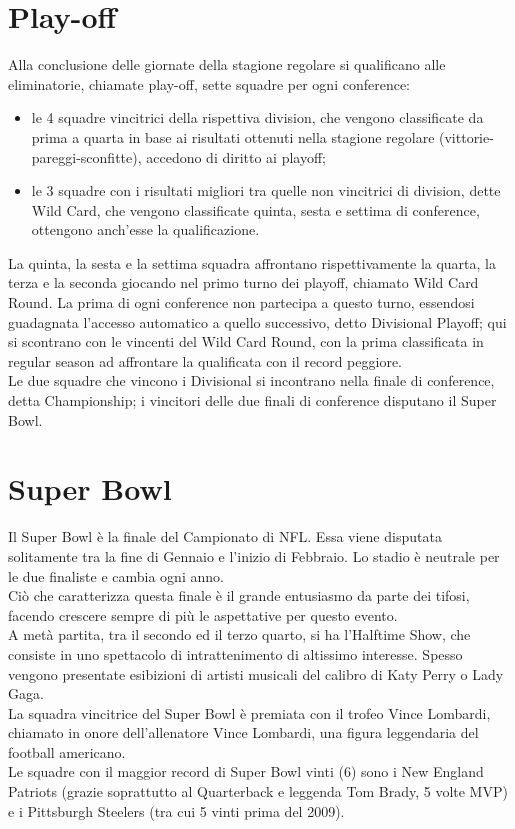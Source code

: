 \documentclass[a4paper, 12pt, oneside]{book}
\begin{document}
	\section{Play-off}
	Alla conclusione delle giornate della stagione regolare si qualificano alle eliminatorie, chiamate play-off, sette squadre per ogni conference:
	\begin{itemize}
		\item le 4 squadre vincitrici della rispettiva division, che vengono classificate da prima a quarta in base ai risultati ottenuti nella stagione regolare (vittorie-pareggi-sconfitte), accedono di diritto ai playoff;
		\item le 3 squadre con i risultati migliori tra quelle non vincitrici di division, dette Wild Card, che vengono classificate quinta, sesta e settima di conference, ottengono anch'esse la qualificazione.
	\end{itemize}
	La quinta, la sesta e la settima squadra affrontano rispettivamente la quarta, la terza e la seconda giocando nel primo turno dei playoff, chiamato Wild Card Round. La prima di ogni conference non partecipa a questo turno, essendosi guadagnata l'accesso automatico a quello successivo, detto Divisional Playoff; qui si scontrano con le vincenti del Wild Card Round, con la prima classificata in regular season ad affrontare la qualificata con il record peggiore.
	\\Le due squadre che vincono i Divisional si incontrano nella finale di conference, detta Championship; i vincitori delle due finali di conference disputano il Super Bowl.
	
	\section{Super Bowl}
	Il Super Bowl è la finale del Campionato di NFL. Essa viene disputata solitamente tra la fine di Gennaio e l'inizio di Febbraio. Lo stadio è neutrale per le due finaliste e cambia ogni anno.
	\\Ciò che caratterizza questa finale è il grande entusiasmo da parte dei tifosi, facendo crescere sempre di più le aspettative per questo evento.
	\\A metà partita, tra il secondo ed il terzo quarto, si ha l'Halftime Show, che consiste in uno spettacolo di intrattenimento di altissimo interesse. Spesso vengono presentate esibizioni di artisti musicali del calibro di Katy Perry o Lady Gaga.
	\\La squadra vincitrice del Super Bowl è premiata con il trofeo Vince Lombardi, chiamato in onore dell'allenatore Vince Lombardi, una figura leggendaria del football americano.
	\\Le squadre con il maggior record di Super Bowl vinti (6) sono i New England Patriots (grazie soprattutto al Quarterback e leggenda Tom Brady, 5 volte MVP) e i Pittsburgh Steelers (tra cui 5 vinti prima del 2009).
	
\end{document}
